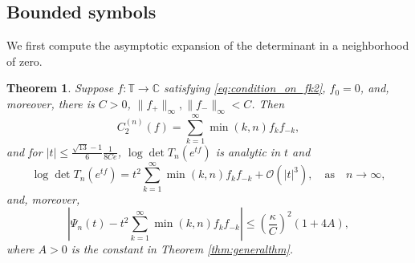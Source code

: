 \documentclass[11pt]{amsart}
\theoremstyle{plain}
\newtheorem{theorem}{Theorem}[section]
\theoremstyle{remark}
\numberwithin{equation}{section}
\begin{document}
\subsection{Bounded symbols}
We first compute the asymptotic expansion of the determinant in a neighborhood of zero. 
%
\begin{theorem}\label{thm:determinant_expansion}
Suppose $f:\mathbb{T}\rightarrow\mathbb{C}$ satisfying \eqref{eq:condition_on_fk2}, $f_0=0$, and, moreover, there is $C>0$, $\|f_+\|_{\infty}, \|f_-\|_{\infty}< C$. Then
\begin{equation}
        C_2^{(n)}(f)= \sum_{k=1}^\infty \min (k,n) f_kf_{-k},
    \end{equation}
and for $|t|\leq 
\frac{\sqrt{13}-1}{6} 
\frac{1}{8Ce}$,
$\log\det T_n(e^{tf})$ is analytic in $t$ and
\begin{equation}
\log\det T_n(e^{tf})= t^2\sum_{k=1}^\infty \min (k,n) f_kf_{-k}+ \mathcal{O}(|t|^3),\quad\text{as}\quad n\rightarrow\infty,
\end{equation}
and, moreover,
$$|
\Psi_n(t)-t^2
\sum_{k=1}^{\infty} 
\min(k,n)
f_kf_{-k} 
|\leq \left(\frac{\kappa}{C}\right)^2(1+4A),$$
where $A>0$ is the constant in Theorem \ref{thm:generalthm}.
\end{theorem}
\end{document}
